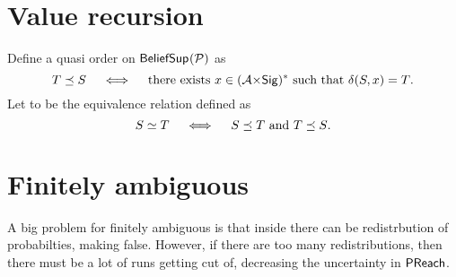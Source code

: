 %
\section{Value recursion}
%
\begin{definition}
Define a quasi order \emphdef{$\tord$} on $\mathsf{BeliefSup}_{}(\mathcal{P})$ as
\[
T \preceq S
\quad\iff\quad
\text{there exists $x\in (\mathcal{A}{\times}\mathsf{Sig})^*$ such that
$\delta(S,x) = T$.}
\]
Let \emphdef{$\teq$} to be the equivalence relation defined as
\[
S \simeq T
\quad\iff\quad
\text{$S\preceq T$ and $T\preceq S$.}
\]
\end{definition}
%
%
\section{Finitely ambiguous}
%
A big problem for finitely ambiguous is that inside  there can be redistrbution of probabilties,
making  false.
However, if there are too many redistributions, then there must be a lot of runs getting cut of,
decreasing the uncertainty in $\mathsf{PReach}{}$. 
%